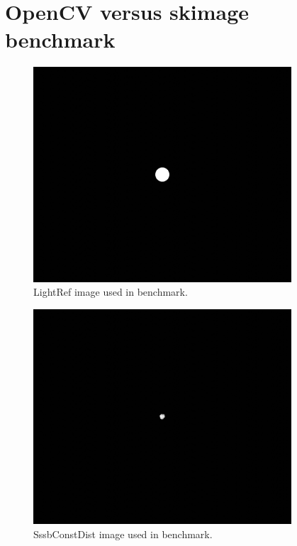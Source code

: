 \section{OpenCV versus skimage benchmark} \label{sec:app_cvskimage}


\begin{figure}[htb]
    \begin{center}
        \includegraphics[height=8cm]{doc/thesis/0_figures/cv_skimage/LightRef_2017-08-15T115851-679000.jpg}
    \end{center}
    \caption{LightRef image used in benchmark.}
    \label{fig:bm_light_ref}
\end{figure}

\begin{figure}[htb]
    \begin{center}
        \includegraphics[height=8cm]{doc/thesis/0_figures/cv_skimage/SssbConstDist_2017-08-15T115851-679000.jpg}
    \end{center}
    \caption{SssbConstDist image used in benchmark.}
    \label{fig:bm_sssbconstdist}
\end{figure}

